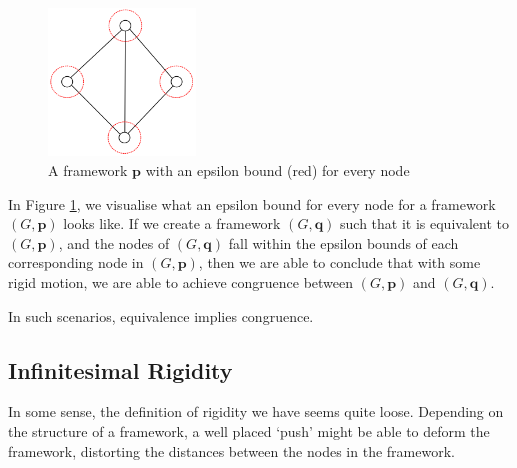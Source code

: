\begin{figure}[htbp]
    \centering
    \includegraphics[width = 0.35\textwidth]{Chapter 2/14. epsilon.png}
    \caption{A framework $\mathbf{p}$ with an epsilon bound (red) for every node}
    \label{fig: epsilon}
\end{figure}
\vspace{-3mm}
\begin{flushleft}
In Figure \ref{fig: epsilon}, we visualise what an epsilon bound for every node for a framework $(G,\textbf{p})$ looks like. If we create a framework $(G,\textbf{q})$ such that it is equivalent to $(G,\mathbf{p})$, and the nodes of $(G,\mathbf{q})$ fall within the epsilon bounds of each corresponding node in $(G,\mathbf{p})$, then we are able to conclude that with some rigid motion, we are able to achieve congruence between $(G,\mathbf{p})$ and $(G,\mathbf{q})$. 

In such scenarios, equivalence implies congruence.    
\end{flushleft}

\subsection{Infinitesimal Rigidity}

\begin{flushleft}
In some sense, the definition of rigidity we have seems quite loose. Depending on the structure of a framework, a well placed `push' might be able to deform the framework, distorting the distances between the nodes in the framework.
\end{flushleft}


